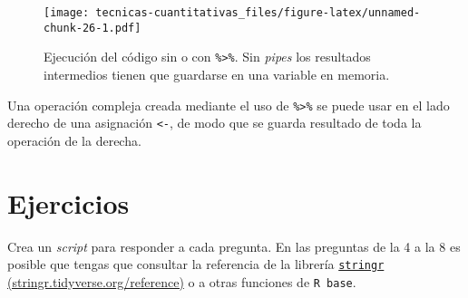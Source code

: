 \documentclass[
]{book}
\newenvironment{Shaded}{\begin{snugshade}}{\end{snugshade}}
\newcommand{\DataTypeTok}[1]{\textcolor[rgb]{0.13,0.29,0.53}{#1}}
\newcommand{\DecValTok}[1]{\textcolor[rgb]{0.00,0.00,0.81}{#1}}
\newcommand{\KeywordTok}[1]{\textcolor[rgb]{0.13,0.29,0.53}{\textbf{#1}}}
\newcommand{\NormalTok}[1]{#1}
\newcommand{\OperatorTok}[1]{\textcolor[rgb]{0.81,0.36,0.00}{\textbf{#1}}}
\newcommand{\StringTok}[1]{\textcolor[rgb]{0.31,0.60,0.02}{#1}}
\begin{document}
\begin{figure}
\centering
\texttt{[image: tecnicas-cuantitativas\_files/figure-latex/unnamed-chunk-26-1.pdf]}
\caption{\label{fig:unnamed-chunk-26}Ejecución del código sin o con \texttt{\%\textgreater{}\%}. Sin \emph{pipes} los resultados intermedios tienen que guardarse en una variable en memoria.}
\end{figure}

Una operación compleja creada mediante el uso de \texttt{\%\textgreater{}\%} se puede usar en el lado derecho de una asignación \texttt{\textless{}-}, de modo que se guarda resultado de toda la operación de la derecha.

\begin{Shaded}
\end{Shaded}

\hypertarget{ejercicios}{%
\section{Ejercicios}\label{ejercicios}}

Crea un \emph{script} para responder a cada pregunta. En las preguntas de la 4 a la 8 es posible que tengas que consultar la referencia de la librería \href{https://stringr.tidyverse.org/reference/index.html}{\texttt{stringr} (stringr.tidyverse.org/reference)} o a otras funciones de \texttt{R\ base}.
\end{document}
